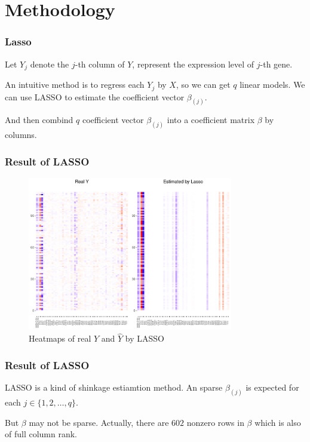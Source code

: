 \section{Methodology}
\begin{frame}
    \sectionpage
\end{frame}

\begin{frame}
    \frametitle{Lasso}

    Let $Y_j$ denote the $j$-th column of $Y$, represent the expression level of $j$-th gene. 

    An intuitive method is to regress each $Y_j$ by $X$, so we can get $q$ linear models. 
    We can use LASSO to estimate the coefficient vector $\beta_{(j)}$. 
    
    And then combind $q$ coefficient vector $\beta_{(j)}$ into a coefficient matrix $\mathbb{\beta}$ by columns. 
\end{frame}

\begin{frame}
    \frametitle{Result of LASSO}

    \begin{figure}[h]
        \centering
        \includegraphics[width=0.8\textwidth]{./figs/lasso.pdf}
        \caption{Heatmaps of real $Y$ and $\hat{Y}$ by LASSO}
    \end{figure}
\end{frame}

\begin{frame}
    \frametitle{Result of LASSO}
    LASSO is a kind of shinkage estiamtion method. 
    An sparse $\beta_{(j)}$ is expected for each $j\in\{ 1,2,\dots,q \}$. 

    But $\mathbb{\beta}$ may not be sparse. 
    Actually, there are $602$ nonzero rows in $\mathbb{\beta}$ which is also of full column rank. 
\end{frame}

